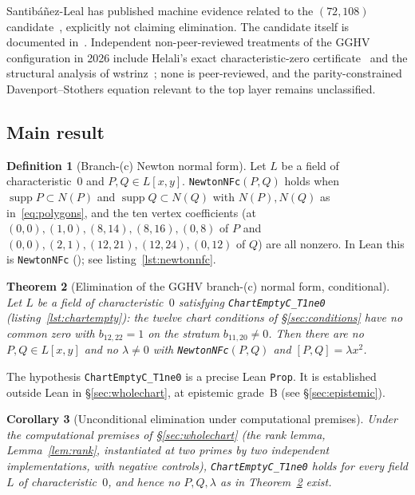 \documentclass[a4paper,11pt]{article}
\newcommand{\filename}[1]{\texttt{\seqsplit{#1}}}
\theoremstyle{plain}
\newtheorem{theorem}{Theorem}[section]
\newtheorem{corollary}[theorem]{Corollary}
\theoremstyle{definition}
\newtheorem{definition}[theorem]{Definition}
\theoremstyle{remark}
\begin{document}
Santib\'a\~nez-Leal has published machine evidence related to the $(72,108)$ candidate~\cite{Santibanez,SantibanezPaper}, explicitly not claiming elimination. The candidate itself is documented in~\cite{JC125note}. Independent non-peer-reviewed treatments of the GGHV configuration in 2026 include Helali's exact characteristic-zero certificate~\cite{Helali} and the structural analysis of wstrinz~\cite{wstrinz}; none is peer-reviewed, and the parity-constrained Davenport--Stothers equation relevant to the top layer remains unclassified.

\subsection{Main result}

\begin{definition}[Branch-(c) Newton normal form]\label{def:newtonnfc}
Let $L$ be a field of characteristic~$0$ and $P,Q\in L[x,y]$. \texttt{NewtonNFc}$(P,Q)$ holds when $\operatorname{supp}P\subset N(P)$ and $\operatorname{supp}Q\subset N(Q)$ with $N(P),N(Q)$ as in~\eqref{eq:polygons}, and the ten vertex coefficients (at $(0,0),(1,0),(8,14),(8,16),(0,8)$ of $P$ and $(0,0),(2,1),(12,21),(12,24),(0,12)$ of $Q$) are all nonzero. In Lean this is \texttt{NewtonNFc} (\filename{Jacobian/BranchC/DescentClaim.lean}); see listing~\ref{lst:newtonnfc}.
\end{definition}

\begin{theorem}[Elimination of the GGHV branch-(c) normal form, conditional]\label{thm:main}
Let $L$ be a field of characteristic~$0$ satisfying \texttt{ChartEmptyC\_T1ne0} (listing~\ref{lst:chartempty}): the twelve chart conditions of \S\ref{sec:conditions} have no common zero with $b_{12,22}=1$ on the stratum $b_{11,20}\ne0$. Then there are no $P,Q\in L[x,y]$ and no $\lambda\ne0$ with \texttt{NewtonNFc}$(P,Q)$ and $[P,Q]=\lambda x^2$.
\end{theorem}

The hypothesis \texttt{ChartEmptyC\_T1ne0} is a precise Lean \texttt{Prop}. It is established outside Lean in \S\ref{sec:wholechart}, at epistemic grade~B (see \S\ref{sec:epistemic}).

\begin{corollary}[Unconditional elimination under computational premises]\label{cor:unconditional}
Under the computational premises of \S\ref{sec:wholechart} (the rank lemma, Lemma~\ref{lem:rank}, instantiated at two primes by two independent implementations, with negative controls), \texttt{ChartEmptyC\_T1ne0} holds for every field $L$ of characteristic~$0$, and hence no $P,Q,\lambda$ as in Theorem~\ref{thm:main} exist.
\end{corollary}
\end{document}
